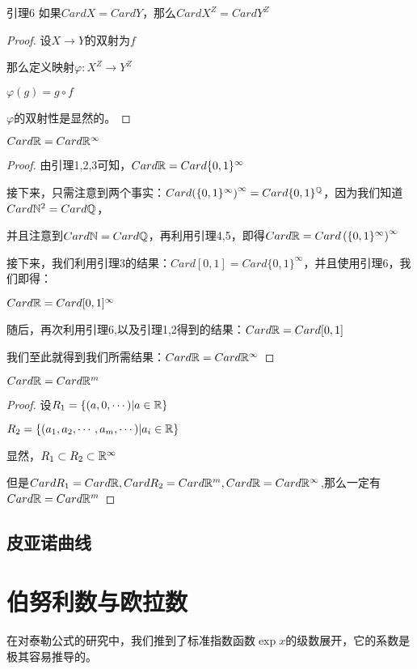 \documentclass[12pt, a4paper, oneside, UTF8]{ctexbook}
\begin{document}
			\begin{lemma}{引理6}
				如果$Card X = Card Y$，那么$Card X^Z = Card Y^Z$
			\end{lemma}
			\begin{proof}
				设$X\rightarrow Y$的双射为$f$
				
				那么定义映射$\varphi:X^Z \rightarrow Y^Z$
				
				$\varphi(g) = g \circ f$
				
				$\varphi$的双射性是显然的。
			\end{proof}
			\begin{proposition}
				$Card \mathbb{R} = Card \mathbb{R}^\infty$
			\end{proposition}
			\begin{proof}
				由引理1,2,3可知，$Card \mathbb{R} = Card \{0,1\}^\infty$
				
				接下来，只需注意到两个事实：$Card {\left(\{0,1\}^{\infty}\right)^{\infty} }= Card \{0,1\}^{\mathbb{Q}}$，因为我们知道$Card {\mathbb{N}^2} = Card {\mathbb{Q}}$，
				
				并且注意到$Card \mathbb{N} = Card \mathbb{Q}$，再利用引理4,5，即得$Card \mathbb{R} = Card \left(\{0,1\}^\infty\right)^\infty$
				
				接下来，我们利用引理3的结果：$Card [0,1] = Card \{0,1\}^\infty$，并且使用引理6，我们即得：
				
				$Card \mathbb{R} = Card [0,1]^\infty$
				
				随后，再次利用引理6,以及引理1,2得到的结果：$Card \mathbb{R} = Card [0,1]$
				
				我们至此就得到我们所需结果：$Card \mathbb{R} = Card \mathbb{R}^\infty$
			\end{proof}
			\begin{proposition}
				$Card \mathbb{R} = Card \mathbb{R}^m$
			\end{proposition}
			\begin{proof}
				设$R_1 = \{(a,0,\cdots)|a \in \mathbb{R}\}$
				
				$R_2 = \{(a_1,a_2,\cdots,a_m,\cdots)|a_i \in \mathbb{R}\}$
				
				显然，$R_1 \subset R_2 \subset \mathbb{R}^\infty$
				
				但是$Card R_1 = Card \mathbb{R},Card R_2 = Card \mathbb{R}^m,Card \mathbb{R} = Card \mathbb{R}^\infty$,那么一定有$Card \mathbb{R} = Card \mathbb{R}^m$
			\end{proof}
		\subsection{皮亚诺曲线}
	\section{伯努利数与欧拉数}
		在对泰勒公式的研究中，我们推到了标准指数函数$\exp x$的级数展开，它的系数是极其容易推导的。
		
\end{document}
